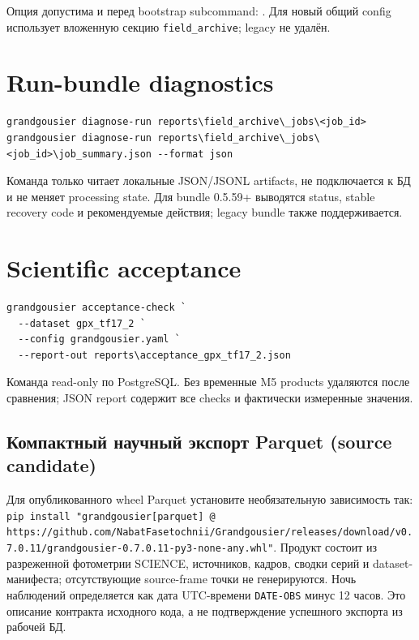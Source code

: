 Опция  допустима и перед bootstrap subcommand: . Для  новый общий config использует вложенную секцию \texttt{field\_archive}; legacy  не удалён.


\section{Run-bundle diagnostics}

\begin{lstlisting}
grandgousier diagnose-run reports\field_archive\_jobs\<job_id>
grandgousier diagnose-run reports\field_archive\_jobs\<job_id>\job_summary.json --format json
\end{lstlisting}

Команда только читает локальные JSON/JSONL artifacts, не подключается к БД и не меняет processing state. Для bundle 0.5.59+ выводятся status, stable recovery code и рекомендуемые действия; legacy bundle также поддерживается.

\section{Scientific acceptance}

\begin{lstlisting}
grandgousier acceptance-check `
  --dataset gpx_tf17_2 `
  --config grandgousier.yaml `
  --report-out reports\acceptance_gpx_tf17_2.json
\end{lstlisting}

Команда read-only по PostgreSQL. Без  временные M5 products удаляются после сравнения; JSON report содержит все checks и фактически измеренные значения.
\subsection{Компактный научный экспорт Parquet (source candidate)}

Для опубликованного wheel Parquet установите необязательную зависимость так:
\texttt{pip install "grandgousier[parquet] @ https://github.com/NabatFasetochnii/Grandgousier/releases/download/v0.7.0.11/grandgousier-0.7.0.11-py3-none-any.whl"}.
Продукт состоит из разреженной фотометрии SCIENCE, источников, кадров, сводки серий и
dataset-манифеста; отсутствующие source-frame точки не генерируются. Ночь наблюдений
определяется как дата UTC-времени \texttt{DATE-OBS} минус 12 часов. Это описание
контракта исходного кода, а не подтверждение успешного экспорта из рабочей БД.
